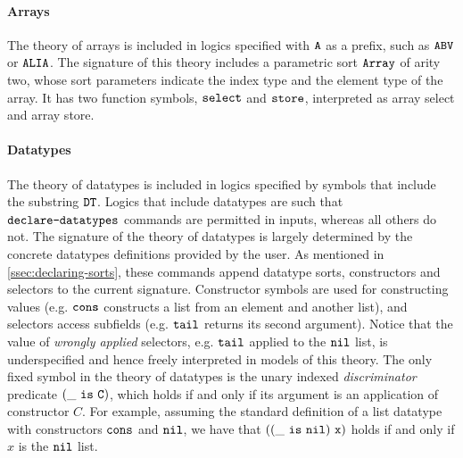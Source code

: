 \documentclass[english,a4paper,10pt]{article}
\begin{document}
\paragraph{Arrays}
The theory of arrays is included in logics specified with ${\tt A}$ as a prefix,
such as ${\tt ABV}$ or ${\tt ALIA}$.
The signature of this theory includes a parametric sort ${\tt Array}$
of arity two, whose sort parameters
indicate the index type and the element type of the array.
It has two function symbols, ${\tt select}$ and ${\tt store}$,
interpreted as array select and array store.

\paragraph{Datatypes}
The theory of datatypes
is included in logics specified 
by symbols that include the substring ${\tt DT}$.
Logics that include datatypes are such that
$\texttt{declare-datatypes}$ commands are permitted in inputs, 
whereas all others do not.
The signature of the theory of datatypes
is largely determined by the concrete datatypes definitions provided
by the user.
As mentioned in \cref{ssec:declaring-sorts}, these commands append datatype sorts, 
constructors and selectors to the current signature.
Constructor symbols are used for constructing
values (e.g. ${\tt cons}$ constructs a list from an element and another list),
and selectors access subfields (e.g. ${\tt tail}$ returns its second argument).
Notice that the value of \emph{wrongly applied} selectors, e.g. ${\tt tail}$ applied
to the ${\tt nil}$ list, is underspecified and hence freely interpreted
in models of this theory.
The only fixed symbol in the theory of datatypes is the unary
indexed \emph{discriminator} predicate ${\tt(\_\ is\ C)}$,
which holds if and only if its argument is an application of constructor $C$.
For example, assuming the standard definition of a list datatype
with constructors ${\tt cons}$ and ${\tt nil}$,
we have that ${\tt ((\_\ is\ nil)\ x)}$ holds if and only if
$x$ is the ${\tt nil}$ list.
\end{document}
